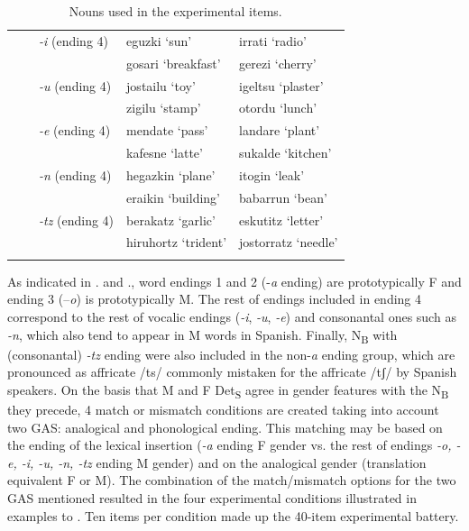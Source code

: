 \documentclass[output=paper]{langscibook}
\begin{document}
\begin{table}
\begin{tabularx}{\textwidth}{@{}l@{}lp{2.5cm}p{3cm}l}
\tablevspace
&  & \textit{{}-i} (ending 4) & eguzki ‘sun’      & irrati ‘radio’\\
&  &                            &  gosari ‘breakfast’ &  gerezi ‘cherry’\\
\tablevspace
&  & \textit{{}-u} (ending 4) & jostailu ‘toy’  & igeltsu ‘plaster’\\
&  &                          & zigilu ‘stamp’  &     otordu ‘lunch’\\
\tablevspace
&  & \textit{{}-e} (ending 4) & mendate ‘pass’   & landare ‘plant’\\
&  &                          &  kafesne ‘latte’  & sukalde ‘kitchen’\\
\tablevspace
&  & \textit{{}-n} (ending 4) & hegazkin ‘plane’& itogin ‘leak’\\
&  &                          & eraikin ‘building’ &babarrun ‘bean’\\
\tablevspace
&  & \textit{{}-tz} (ending 4) & berakatz ‘garlic’& eskutitz ‘letter’\\
&  &                           & hiruhortz ‘trident’ & jostorratz ‘needle’\\
\lspbottomrule
\end{tabularx}
\caption{Nouns used in the experimental items.}
\label{tab:ezeiza:3}
\end{table}

As indicated in . and ., word endings 1 and 2 (-\textit{a} ending) are prototypically F and ending 3 (–\textit{o}) is prototypically M. The rest of endings included in ending 4 correspond to the rest of vocalic endings (\textit{{}-i}, \textit{{}-u}, \textit{{}-e}) and consonantal ones such as \textit{-n}, which also tend to appear in M words in Spanish. Finally, N\textsubscript{B} with (consonantal) \textit{-tz} ending were also included in the non-\textit{a} ending group, which are pronounced as affricate /ts/ commonly mistaken for the affricate /tʃ/ by Spanish speakers. On the basis that M and F Det\textsubscript{S} agree in gender features with the N\textsubscript{B} they precede, 4 match or mismatch conditions are created taking into account two GAS: analogical and phonological ending. This matching may be based on the ending of the lexical insertion (\textit{{}-a} ending F gender vs. the rest of endings \textit{-o, -e, -i, -u, -n, -tz} ending M gender) and on the analogical gender (translation equivalent F or M). The combination of the match/mismatch options for the two GAS mentioned resulted in the four experimental conditions illustrated in examples  to . Ten items per condition made up the 40-item experimental battery.
\end{document}
